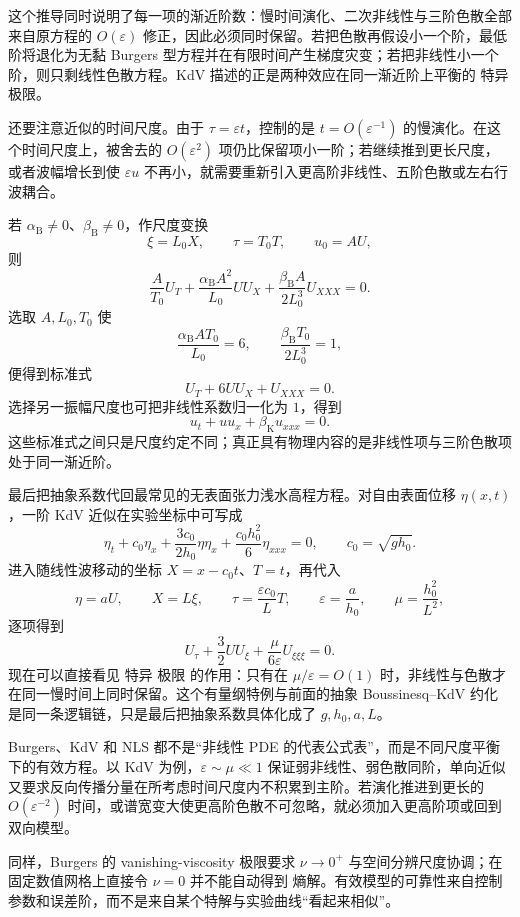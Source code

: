这个推导同时说明了每一项的渐近阶数：慢时间演化、二次非线性与三阶色散全部来自原方程的 $O(\varepsilon)$ 修正，因此必须同时保留。若把色散再假设小一个阶，最低阶将退化为无黏 Burgers 型方程并在有限时间产生梯度灾变；若把非线性小一个阶，则只剩线性色散方程。KdV 描述的正是两种效应在同一渐近阶上平衡的 特异 极限。

还要注意近似的时间尺度。由于 $\tau=\varepsilon t$，控制的是 $t=O(\varepsilon^{-1})$ 的慢演化。在这个时间尺度上，被舍去的 $O(\varepsilon^2)$ 项仍比保留项小一阶；若继续推到更长尺度，或者波幅增长到使 $\varepsilon u$ 不再小，就需要重新引入更高阶非线性、五阶色散或左右行波耦合。

若 $\alpha_{\mathrm B}\ne0$、$\beta_{\mathrm B}\ne0$，作尺度变换
\[
\xi=L_0X,
\qquad \tau=T_0T,
\qquad u_0=AU,
\]
则
\[
\frac{A}{T_0}U_T+\frac{\alpha_{\mathrm B}A^2}{L_0}UU_X
+\frac{\beta_{\mathrm B}A}{2L_0^3}U_{XXX}=0.
\]
选取 $A,L_0,T_0$ 使
\[
\frac{\alpha_{\mathrm B}AT_0}{L_0}=6,
\qquad
\frac{\beta_{\mathrm B}T_0}{2L_0^3}=1,
\]
便得到标准式
\[
U_T+6UU_X+U_{XXX}=0.
\]
选择另一振幅尺度也可把非线性系数归一化为 $1$，得到
\[
u_t+uu_x+\beta_{\mathrm K}u_{xxx}=0.
\]
这些标准式之间只是尺度约定不同；真正具有物理内容的是非线性项与三阶色散项处于同一渐近阶。

最后把抽象系数代回最常见的无表面张力浅水高程方程。对自由表面位移 $\eta(x,t)$，一阶 KdV 近似在实验坐标中可写成
\begin{equation*}\boxed{
\eta_t+c_0\eta_x+\frac{3c_0}{2h_0}\eta\eta_x
+\frac{c_0h_0^2}{6}\eta_{xxx}=0,
\qquad c_0=\sqrt{gh_0}
}.\end{equation*}
进入随线性波移动的坐标 $X=x-c_0t$、$T=t$，再代入
\[
\eta=aU,
\qquad X=L\xi,
\qquad \tau=\frac{\varepsilon c_0}{L}T,
\qquad
\varepsilon=\frac{a}{h_0},
\qquad
\mu=\frac{h_0^2}{L^2},
\]
逐项得到
\[
U_\tau+\frac32UU_\xi+\frac{\mu}{6\varepsilon}U_{\xi\xi\xi}=0.
\]
现在可以直接看见 特异 极限 的作用：只有在 $\mu/\varepsilon=O(1)$ 时，非线性与色散才在同一慢时间上同时保留。这个有量纲特例与前面的抽象 Boussinesq--KdV 约化是同一条逻辑链，只是最后把抽象系数具体化成了 $g,h_0,a,L$。

Burgers、KdV 和 NLS 都不是“非线性 PDE 的代表公式表”，而是不同尺度平衡下的有效方程。以 KdV 为例，$\varepsilon\sim\mu\ll1$ 保证弱非线性、弱色散同阶，单向近似又要求反向传播分量在所考虑时间尺度内不积累到主阶。若演化推进到更长的 $O(\varepsilon^{-2})$ 时间，或谱宽变大使更高阶色散不可忽略，就必须加入更高阶项或回到双向模型。

同样，Burgers 的 vanishing-viscosity 极限要求 $\nu\to0^+$ 与空间分辨尺度协调；在固定数值网格上直接令 $\nu=0$ 并不能自动得到 熵解。有效模型的可靠性来自控制参数和误差阶，而不是来自某个特解与实验曲线“看起来相似”。

